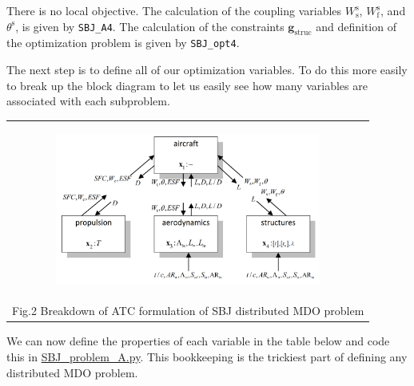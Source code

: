 \documentclass[11pt]{article}
\begin{document}
There is no local objective. The calculation of the coupling variables
\(W_{\mathrm{s}}^{\mathrm{s}}\), \(W_{\mathrm{f}}^{\mathrm{s}}\), and
\(\theta^{\mathrm{s}}\), is given by \texttt{SBJ\_A4}. The calculation
of the constraints \(\mathbf{g}_{\mathrm{struc}}\) and definition of the
optimization problem is given by \texttt{SBJ\_opt4}.

The next step is to define all of our optimization variables. To do this
more easily to break up the block diagram to let us easily see how many
variables are associated with each subproblem.

\begin{longtable}[]{@{}c@{}}
    \toprule
    \endhead
    \begin{minipage}[t]{0.97\columnwidth}\centering
        \begin{figure}
            \centering
            \includegraphics[height=5cm]{images/SBJ_schematics_002.png}
        \end{figure}\strut
    \end{minipage}\tabularnewline
    \begin{minipage}[t]{0.97\columnwidth}\centering
        Fig.2 Breakdown of ATC formulation of SBJ distributed MDO
problem\strut
    \end{minipage}\tabularnewline
    \bottomrule
\end{longtable}

We can now define the properties of each variable in the table below and
code this in \url{SBJ_problem_A.py}. This bookkeeping is the trickiest
part of defining any distributed MDO problem.
\end{document}

